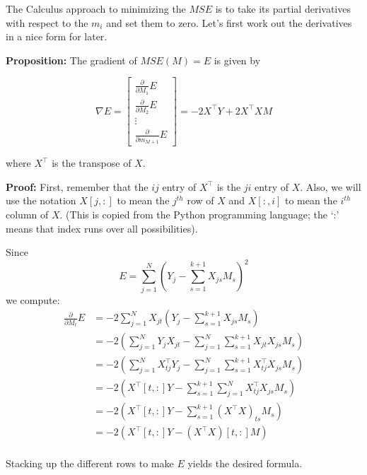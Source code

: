 \documentclass[
]{article}
\begin{document}
The Calculus approach to minimizing the \(MSE\) is to take its partial
derivatives with respect to the \(m_{i}\) and set them to zero. Let's
first work out the derivatives in a nice form for later.

\textbf{Proposition:} The gradient of \(MSE(M)=E\) is given by

\begin{equation} \nabla E = \left[\begin{matrix} \frac{\partial}{\partial M_1}E \\ \frac{\partial}{\partial M_2}E \\ \vdots \\
\frac{\partial}{\partial m_{M+1}}E\end{matrix}\right] = -2 X^{\intercal}Y + 2
X^{\intercal}XM \label{eq:gradient}\end{equation}

where \(X^{\intercal}\) is the transpose of \(X\).

\textbf{Proof:} First, remember that the \(ij\) entry of
\(X^{\intercal}\) is the \(ji\) entry of \(X\). Also, we will use the
notation \(X[j,:]\) to mean the \(j^{th}\) row of \(X\) and \(X[:,i]\)
to mean the \(i^{th}\) column of \(X\). (This is copied from the Python
programming language; the `:' means that index runs over all
possibilities).

Since \[ E = \sum_{j=1}^{N} (Y_j-\sum_{s=1}^{k+1} X_{js}M_{s})^2 \] we
compute:
\begin{equation}\begin{aligned} \frac{\partial}{\partial M_t}E &= -2\sum_{j=1}^{N}
X_{jt}(Y_{j}-\sum_{s=1}^{k+1} X_{js}M_{s}) \\ &= -2(\sum_{j=1}^{N}
Y_{j}X_{jt} - \sum_{j=1}^{N}\sum_{s=1}^{k+1} X_{jt}X_{js}M_{s}) \\ &=
-2(\sum_{j=1}^{N} X^{\intercal}_{tj}Y_{j}
-\sum_{j=1}^{N}\sum_{s=1}^{k+1} X^{\intercal}_{tj}X_{js}M_{s}) \\ &=
-2(X^{\intercal}[t,:]Y - \sum_{s=1}^{k+1}\sum_{j=1}^{N}
X^{\intercal}_{tj}X_{js}M_{s}) \\ &= -2(X^{\intercal}[t,:]Y -
\sum_{s=1}^{k+1} (X^{\intercal}X)_{ts}M_{s}) \\ &=
-2(X^{\intercal}[t,:]Y - (X^{\intercal}X)[t,:]M)\\
\end{aligned}\label{eq:gradient2}\end{equation}

Stacking up the different rows to make \(E\) yields the desired formula.
\end{document}

